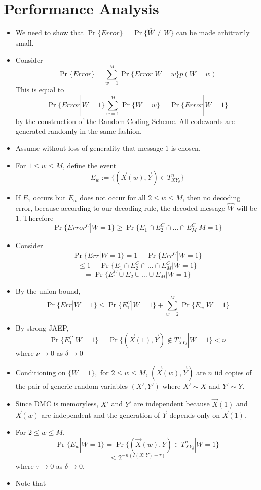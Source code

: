 \documentclass[../main.tex]{subfiles}
\begin{document}
\section{Performance Analysis}
\begin{itemize}
    \item We need to show that $\Pr\{Error\}=\Pr\{\hat{W}\neq W\}$ can be made arbitrarily small.
    \item Consider \[
    \Pr\{Error\} = \sum_{w=1}^M \Pr\{Error|W=w\}p(W=w)
    \]\[
    \]
    This is equal to \[
    \Pr\{Error|W=1\}\sum_{w=1}^M\Pr\{W=w\} = \Pr\{Error|W=1\}
    \] by the construction of the Random Coding Scheme. All codewords are generated randomly in the same fashion.
    \item Assume without loss of generality that message $1$ is chosen.
    \item For $1\leq w\leq M$, define the event \[
    E_w := \{(\vec X(w), \vec Y)\in T^n_{XY_\delta}\}
    \]
    \item If $E_1$ occurs but $E_w$ does not occur for all $2\leq w\leq M$, then no decoding error, because according to our decoding rule, the decoded message $\hat{W}$ will be $1$. Therefore \[
    \Pr\{Error^C|W=1\} \geq \Pr\{E_1\cap E_2^C\cap \dots\cap E_M^C|M=1\}
    \]
    \item Consider \[
    \Pr\{Err|W=1\} = 1-\Pr\{Err^C|W=1\}
    \]
    \[
    \leq 1- \Pr\{E_1\cap E_2^C\cap \dots\cap E_M^C|W=1\}
    \]
    \[
    = \Pr\{E_1^C\cup E_2\cup \dots\cup E_M|W=1\}
    \]
    \item By the union bound, \[
    \Pr\{Err|W=1\}\leq \Pr\{E_1^C|W=1\}+\sum_{w=2}^M\Pr\{E_w|W=1\}
    \]
    \item By strong JAEP,
    \[
    \Pr\{E_1^C|W=1\}=\Pr\{(\vec X(1), \vec Y)\notin T^n_{XY_\delta}|W=1\}<\nu
    \]
    where $\nu \to 0$ as $\delta \to 0$
    \item Conditioning on $\{W=1\},$ for $2\leq w\leq M$, $(\vec X(w),\vec Y)$ are $n$ iid copies of the pair of generic random variables $(X',Y')$ where $X'\sim X$ and $Y'\sim Y$.
    \item Since DMC is memoryless, $X'$ and $Y'$ are independent because $\vec X(1)$ and $\vec X(w)$ are independent and the generation of $\vec Y$ depends only on $\vec X(1)$.
    \item For $2\leq w\leq M$, \[
    \Pr\{E_w|W=1\}= \Pr\{(\vec X(w),Y)\in T^n_{XY_\delta}|W=1\}
    \]
    \[
    \leq 2^{-n(I(X;Y)-\tau)}
    \] where $\tau \to 0$ as $\delta \to 0.$
    \item Note that \[
\]
\end{itemize}
\end{document}
